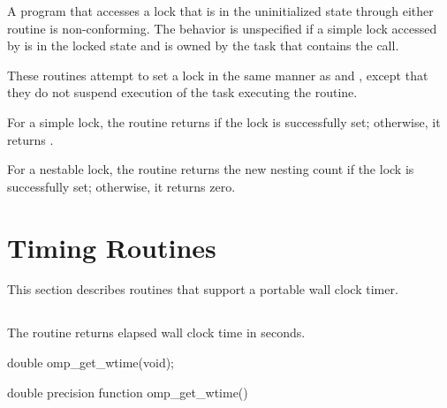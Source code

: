 \constraints
A program that accesses a lock that is in the uninitialized state through either routine is 
non-conforming. The behavior is unspecified if a simple lock accessed by 
 is in the locked state and is owned by the task that contains the call.

\effect 
These routines attempt to set a lock in the same manner as  and 
, except that they do not suspend execution of the task 
executing the routine.

For a simple lock, the  routine returns  if the lock is successfully 
set; otherwise, it returns .

For a nestable lock, the  routine returns the new nesting count 
if the lock is successfully set; otherwise, it returns zero.





\vspace{-24pt}


\section{Timing Routines}
\label{sec:Timing Routines}
This section describes routines that support a portable wall clock timer.

\vspace{-12pt}









\subsection{}
\label{subsec:omp_get_wtime}
\summary
The  routine returns elapsed wall clock time in seconds.

\format
\ccppspecificstart
\begin{boxedcode}
double omp\_get\_wtime(void);
\end{boxedcode}
\ccppspecificend

\fortranspecificstart
\begin{boxedcode}
double precision function omp\_get\_wtime()
\end{boxedcode}
\fortranspecificend

